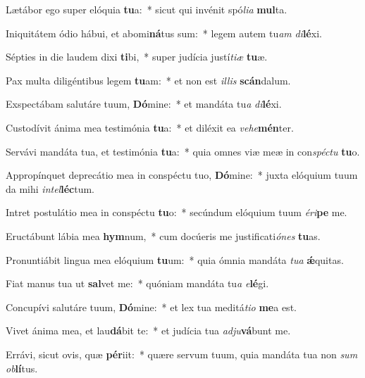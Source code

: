 \item Lætábor ego super elóquia \textbf{tu}a:~* sicut qui invénit spó\textit{li}\textit{a} \textbf{mul}ta.
\item Iniquitátem ódio hábui, et abomi\textbf{ná}tus sum:~* legem autem tu\textit{am} \textit{di}\textbf{lé}xi.
\item Sépties in die laudem dixi \textbf{ti}bi,~* super judícia justí\textit{ti}\textit{æ} \textbf{tu}æ.
\item Pax multa diligéntibus legem \textbf{tu}am:~* et non est \textit{il}\textit{lis} \textbf{scán}dalum.
\item Exspectábam salutáre tuum, \textbf{Dó}mine:~* et mandáta tu\textit{a} \textit{di}\textbf{lé}xi.
\item Custodívit ánima mea testimónia \textbf{tu}a:~* et diléxit ea \textit{ve}\textit{he}\textbf{mén}ter.
\item Servávi mandáta tua, et testimónia \textbf{tu}a:~* quia omnes viæ meæ in con\textit{spéc}\textit{tu} \textbf{tu}o.
\item Appropínquet deprecátio mea in conspéctu tuo, \textbf{Dó}mine:~* juxta elóquium tuum da mihi \textit{in}\textit{tel}\textbf{léc}tum.
\item Intret postulátio mea in conspéctu \textbf{tu}o:~* secúndum elóquium tuum \textit{é}\textit{ri}\textbf{pe} me.
\item Eructábunt lábia mea \textbf{hym}num,~* cum docúeris me justificati\textit{ó}\textit{nes} \textbf{tu}as.
\item Pronuntiábit lingua mea elóquium \textbf{tu}um:~* quia ómnia mandáta \textit{tu}\textit{a} \textbf{ǽ}quitas.
\item Fiat manus tua ut \textbf{sal}vet me:~* quóniam mandáta tu\textit{a} \textit{e}\textbf{lé}gi.
\item Concupívi salutáre tuum, \textbf{Dó}mine:~* et lex tua meditá\textit{ti}\textit{o} \textbf{me}a est.
\item Vivet ánima mea, et lau\textbf{dá}bit te:~* et judícia tua \textit{ad}\textit{ju}\textbf{vá}bunt me.
\item Errávi, sicut ovis, quæ \textbf{pér}iit:~* quære servum tuum, quia mandáta tua non \textit{sum} \textit{ob}\textbf{lí}tus.

